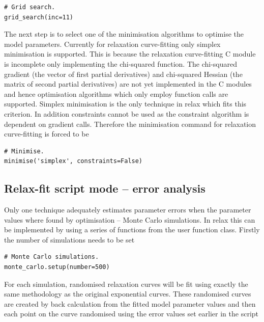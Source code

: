 \begin{lstlisting}[firstnumber=62]
# Grid search.
grid_search(inc=11)
\end{lstlisting}

The next step is to select one of the minimisation algorithms to optimise the model parameters.  Currently for relaxation curve-fitting only simplex minimisation is supported.  This is because the relaxation curve-fitting C module is incomplete only implementing the chi-squared function.  The chi-squared gradient (the vector of first partial derivatives) and chi-squared Hessian (the matrix of second partial derivatives) are not yet implemented in the C modules and hence optimisation algorithms which only employ function calls are supported.  Simplex minimisation is the only technique in relax which fits this criterion.  In addition constraints cannot be used as the constraint algorithm is dependent on gradient calls.  Therefore the minimisation command for relaxation curve-fitting is forced to be

\begin{lstlisting}[firstnumber=65]
# Minimise.
minimise('simplex', constraints=False)
\end{lstlisting}




\subsection{Relax-fit script mode -- error analysis}

Only one technique adequately estimates parameter errors when the parameter values where found by optimisation -- Monte Carlo simulations.  In relax this can be implemented by using a series of functions from the  user function class.  Firstly the number of simulations needs to be set

\begin{lstlisting}[firstnumber=68]
# Monte Carlo simulations.
monte_carlo.setup(number=500)
\end{lstlisting}

For each simulation, randomised relaxation curves will be fit using exactly the same methodology as the original exponential curves.  These randomised curves are created by back calculation from the fitted model parameter values and then each point on the curve randomised using the error values set earlier in the script

